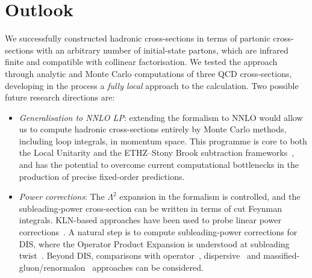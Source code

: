 \documentclass[%
 reprint,
 amsmath,amssymb,
 superscriptaddress,
 aps,
 preprintnumbers,
prl,
floatfix,
]{revtex4-2}
\begin{document}
\section{Outlook}

We successfully constructed hadronic cross-sections in terms of partonic cross-sections with an arbitrary number of initial-state partons, which are infrared finite %
and compatible with collinear factorisation.
We tested the approach through analytic and Monte Carlo computations of three QCD cross-sections, developing in the process a \emph{fully local} approach to the calculation.
Two possible future research directions are: 

\begin{itemize}
\item[\textit{i}] \textit{Generalisation to NNLO LP}: extending the formalism to NNLO would allow us to compute hadronic cross-sections entirely by Monte Carlo methods, including loop integrals, in momentum space.
This programme is core to both the Local Unitarity and the ETHZ--Stony Brook subtraction frameworks~\cite{Anastasiou:2018rib,Anastasiou:2020sdt,Anastasiou:2022eym,Anastasiou:2024xvk,Anastasiou:2026kpm,Capatti:2019ypt,Capatti:2019edf,Kermanschah:2021wbk,Kermanschah:2024utt,Kermanschah:2025wlo}, and has the potential to overcome current computational bottlenecks in the production of precise fixed-order predictions.

\item[\textit{ii}] \textit{Power corrections}: The $\Lambda^2$ expansion in the formalism is controlled, and the subleading-power cross-section can be written in terms of cut Feynman integrals. KLN-based approaches have been used to probe linear power corrections~\cite{Akhoury_1996,Akhoury:1995sp,Fontes:2026uji}.
A natural step is to compute subleading-power corrections for DIS, where the Operator Product Expansion is understood at subleading twist~\cite{JAFFE1981467,Ellis:1982cd,Blumlein:2008kz}.
Beyond DIS, comparisons with operator~\cite{Qiu:1990xxa,Feige2017SubleadingFactorization,Moult:2018jjd,Moult2017SubleadingBasis,Moult2019RadiativeFunctions,Beneke2018SubleadingNJet,Beneke2019NLPDrellYan,Beneke2020ThresholdFactorization}, dispersive~\cite{Dokshitzer1998Milan,DokshitzerMarchesiniWebber1996Dispersive,DokshitzerWebber1995PowerCorrections} and massified-gluon/renormalon~\cite{Korchemsky_1995,NasonSeymour1995Renormalons,BenekeBraun1995DrellYan,FerrarioRavasio2019Renormalons,Caola:2021kzt,Caola:2022vea,Fontes:2026uji} approaches can be considered.

\end{itemize}
\end{document}
